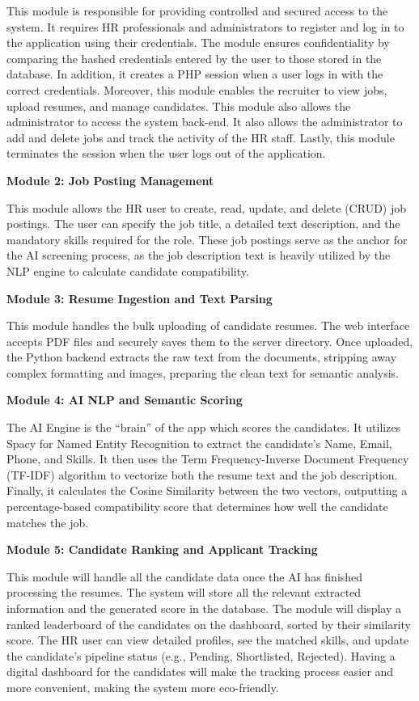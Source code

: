 \documentclass[12pt,a4paper]{report}
\begin{document}
This module is responsible for providing controlled and secured access to the system. It requires HR professionals and administrators to register and log in to the application using their credentials. The module ensures confidentiality by comparing the hashed credentials entered by the user to those stored in the database. In addition, it creates a PHP session when a user logs in with the correct credentials. Moreover, this module enables the recruiter to view jobs, upload resumes, and manage candidates. This module also allows the administrator to access the system back-end. It also allows the administrator to add and delete jobs and track the activity of the HR staff. Lastly, this module terminates the session when the user logs out of the application.

\textbf{Module 2: Job Posting Management}

This module allows the HR user to create, read, update, and delete (CRUD) job postings. The user can specify the job title, a detailed text description, and the mandatory skills required for the role. These job postings serve as the anchor for the AI screening process, as the job description text is heavily utilized by the NLP engine to calculate candidate compatibility.

\textbf{Module 3: Resume Ingestion and Text Parsing}

This module handles the bulk uploading of candidate resumes. The web interface accepts PDF files and securely saves them to the server directory. Once uploaded, the Python backend extracts the raw text from the documents, stripping away complex formatting and images, preparing the clean text for semantic analysis.

\textbf{Module 4: AI NLP and Semantic Scoring}

The AI Engine is the “brain” of the app which scores the candidates. It utilizes Spacy for Named Entity Recognition to extract the candidate's Name, Email, Phone, and Skills. It then uses the Term Frequency-Inverse Document Frequency (TF-IDF) algorithm to vectorize both the resume text and the job description. Finally, it calculates the Cosine Similarity between the two vectors, outputting a percentage-based compatibility score that determines how well the candidate matches the job.

\textbf{Module 5: Candidate Ranking and Applicant Tracking}

This module will handle all the candidate data once the AI has finished processing the resumes. The system will store all the relevant extracted information and the generated score in the database. The module will display a ranked leaderboard of the candidates on the dashboard, sorted by their similarity score. The HR user can view detailed profiles, see the matched skills, and update the candidate's pipeline status (e.g., Pending, Shortlisted, Rejected). Having a digital dashboard for the candidates will make the tracking process easier and more convenient, making the system more eco-friendly.
\end{document}

